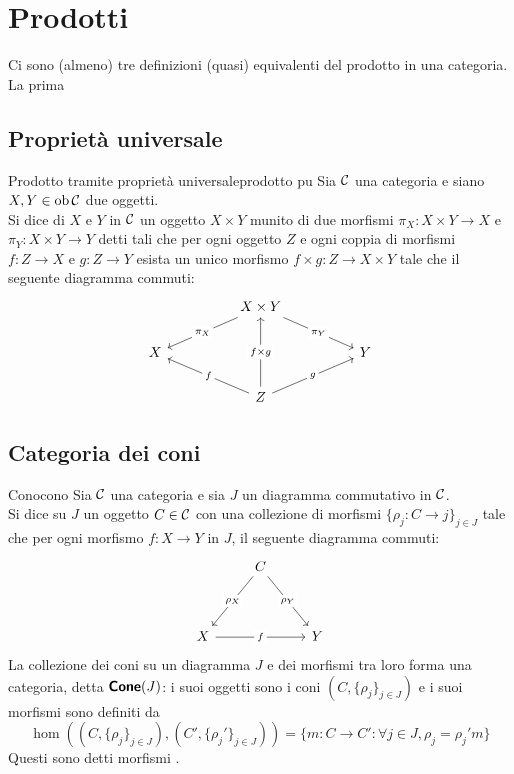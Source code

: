 \documentclass{article}
\renewcommand\C{\mc{C}}
\begin{document}
\section{Prodotti}

Ci sono (almeno) tre definizioni (quasi) equivalenti del prodotto in una categoria. La prima

\subsection{Proprietà universale}
\begin{definition}{Prodotto tramite proprietà universale}{prodotto pu}
    Sia $\C$ una categoria e siano $X,Y \in \ob\C$ due oggetti.\\
    Si dice  di $X$ e $Y$ in $\C$ un oggetto $X\times Y$ munito di due morfismi $\pi_X : X\times Y\to X$ e $\pi_Y:X\times Y \to Y$ detti  tali che per ogni oggetto $Z$ e ogni coppia di morfismi $f:Z\to X$ e $g:Z\to Y$ esista un unico morfismo $f\times g: Z\to X\times Y$ tale che il seguente diagramma commuti:
    \[\begin{tikzcd}
	    && {X\times Y} \\
    	X &&&& Y \\
    	&& Z
    	\arrow["{\pi_X}"{description}, from=1-3, to=2-1]
    	\arrow["{\pi_Y}"{description}, from=1-3, to=2-5]
    	\arrow["{f\times g}"{description}, from=3-3, to=1-3]
    	\arrow["f"{description}, from=3-3, to=2-1]
    	\arrow["g"{description}, from=3-3, to=2-5]
    \end{tikzcd}\]
\end{definition}

\subsection{Categoria dei coni}

\begin{definition}{Cono}{cono}
    Sia $\C$ una categoria e sia $J$ un diagramma commutativo in $\C$.\\
    Si dice  su $J$ un oggetto $C \in \C$ con una collezione di morfismi $\{\rho_j : C \to j\}_{j \in J}$ tale che per ogni morfismo $f : X\to Y$ in $J$, il seguente diagramma commuti:
    \[\begin{tikzcd}
	    & C \\
	    \\
	    X && Y
	    \arrow["{\rho_X}"{description}, from=1-2, to=3-1]
	    \arrow["{\rho_Y}"{description}, from=1-2, to=3-3]
	    \arrow["f"{description}, from=3-1, to=3-3]
    \end{tikzcd}\]
    La collezione dei coni su un diagramma $J$ e dei morfismi tra loro forma una categoria, detta $\text{\sffamily\textbf{Cone}}(J)$: i suoi oggetti sono i coni $(C,\{\rho_j\}_{j \in J})$ e i suoi morfismi sono definiti da 
    \[ \hom((C,\{\rho_j\}_{j \in J}), (C',\{\rho_j'\}_{j \in J})) = \{m : C\to C' : \forall j \in J, \rho_j = \rho_j' m\}\]
    Questi sono detti morfismi .
\end{definition}
\end{document}
